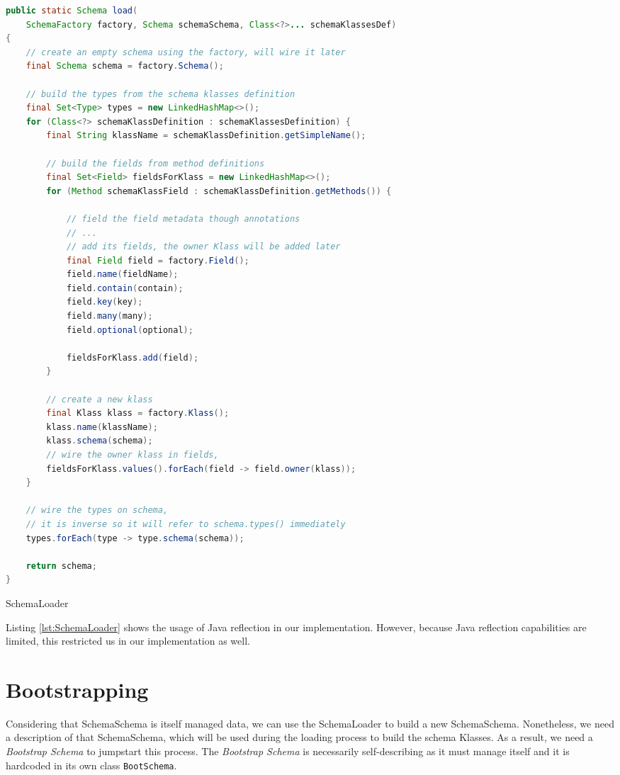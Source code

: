 \begin{sourcecode} [H]
	\begin{lstlisting}[language=Java, escapechar=|]
public static Schema load(
	SchemaFactory factory, Schema schemaSchema, Class<?>... schemaKlassesDef) 
{
	// create an empty schema using the factory, will wire it later
	final Schema schema = factory.Schema();

	// build the types from the schema klasses definition
	final Set<Type> types = new LinkedHashMap<>();
	for (Class<?> schemaKlassDefinition : schemaKlassesDefinition) {
		final String klassName = schemaKlassDefinition.getSimpleName();

		// build the fields from method definitions
		final Set<Field> fieldsForKlass = new LinkedHashMap<>();
		for (Method schemaKlassField : schemaKlassDefinition.getMethods()) {

			// field the field metadata though annotations
			// ...
			// add its fields, the owner Klass will be added later
            final Field field = factory.Field();
            field.name(fieldName);
            field.contain(contain);
            field.key(key);
            field.many(many);
            field.optional(optional);

            fieldsForKlass.add(field);
		}
   
		// create a new klass
		final Klass klass = factory.Klass();
		klass.name(klassName);
		klass.schema(schema);
		// wire the owner klass in fields,
		fieldsForKlass.values().forEach(field -> field.owner(klass));
	}

	// wire the types on schema, 
	// it is inverse so it will refer to schema.types() immediately
	types.forEach(type -> type.schema(schema));

	return schema;
}
	\end{lstlisting}
	\caption{SchemaLoader}
	\label{lst:SchemaLoader}
\end{sourcecode}

Listing \ref{lst:SchemaLoader} shows the usage of Java reflection in our implementation.
However, because Java reflection capabilities are limited, this restricted us in our implementation as well.

\section{Bootstrapping}\label{sec:Bootstrapping}
Considering that SchemaSchema is itself managed data, we can use the SchemaLoader to build a new SchemaSchema.
Nonetheless, we need a description of that SchemaSchema, which will be used during the loading process to build the schema Klasses.
As a result, we need a \textit{Bootstrap Schema} to jumpstart this process.
The \textit{Bootstrap Schema} is necessarily self-describing as it must manage itself \cite{loh2012managed} and it is hardcoded in its own class \texttt{BootSchema}.

